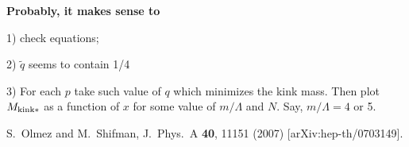 \documentclass[epsfig,12pt]{article}
\begin{document}
\vspace{1cm}

{\bf Probably, it makes sense to }

1) check equations;

2) $\tilde q$ seems to contain 1/4

3) For each $p$ take such value of $q$ which minimizes the kink mass.
Then plot $M_{\rm kink*}$ as a function of $x$
for some value of $m/\Lambda$ and $N$. Say,
$m/\Lambda = 4$ or 5.



\small
\begin{thebibliography}{99}
\itemsep -2pt

S.~Olmez and M.~Shifman,
  J.\ Phys.\ A  {\bf 40}, 11151 (2007)
  [arXiv:hep-th/0703149].

  
  
\end{thebibliography}
\end{document}
